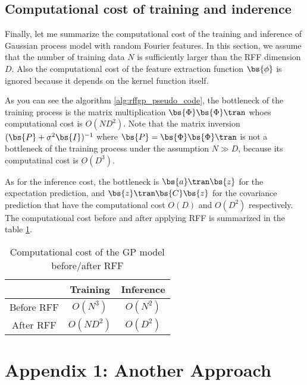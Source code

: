 \documentclass[twocolumn,a4paper,10pt]{article}
\begin{document}
\subsection{Computational cost of training and inderence}

Finally, let me summarize the computational cost of the training and inference of Gaussian process
model with random Fourier features. In this section, we assume that the number of training data $N$
is sufficiently larger than the RFF dimension $D$. Also the computational cost of the feature
extraction function $\bs{\phi}$ is ignored because it depends on the kernel function itself.  

As you can see the algorithm \ref{alg:rffgp_pseudo_code}, the bottleneck of the training process is
the matrix multiplication $\bs{\Phi} \bs{\Phi}\tran$ whoes computational cost is $O(N D^2)$.
Note that the matrix inversion $(\bs{P} + \sigma^2 \bs{I})^{-1}$ where
$\bs{P} = \bs{\Phi}\bs{\Phi}\tran$ is not a bottleneck of the training process under
the assumption $N \gg D$, because its computatinal cost is $O(D^3)$.

As for the inference cost, the bottleneck is $\bs{a}\tran \bs{z}$ for the expectation prediction,
and $\bs{z}\tran \bs{C} \bs{z}$ for the covariance prediction that have the 
computational cost $O(D)$ and $O(D^2)$ respectively. The computational cost before and after
applying RFF is summarized in the table \ref{tab:gp_complexity}.

\begin{table}[h]
    \caption{Computational cost of the GP model before/after RFF}
    \label{tab:gp_complexity}
    \begin{center}\begin{tabular}{ccc}
        \hline
         & Training & Inference \\
        \hline
        Before RFF & $O(N^3)$   & $O(N^2)$ \\  
        After RFF  & $O(N D^2)$ & $O(D^2)$ \\
        \hline
    \end{tabular}\end{center}
\end{table}


\newpage
\appendix

\section{Appendix 1: Another Approach}\titlebar
\end{document}
